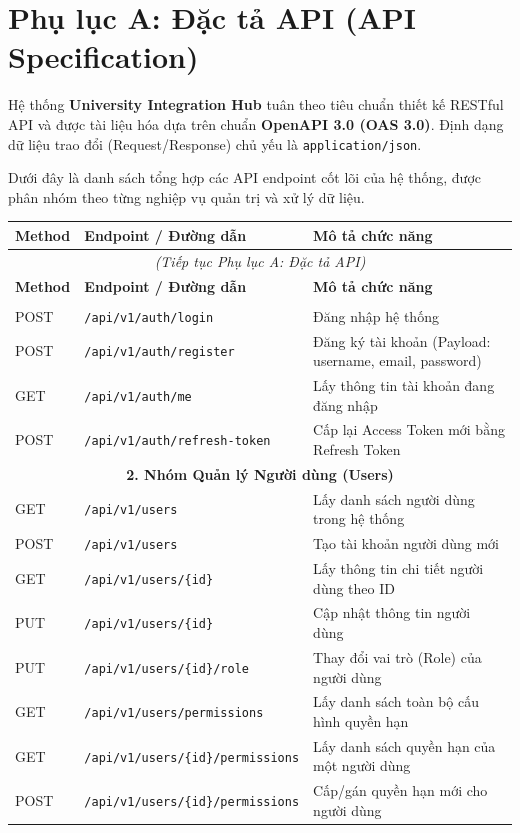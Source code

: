 \section*{Phụ lục A: Đặc tả API (API Specification)}

Hệ thống \textbf{University Integration Hub} tuân theo tiêu chuẩn thiết kế RESTful API và được tài liệu hóa dựa trên chuẩn \textbf{OpenAPI 3.0 (OAS 3.0)}. Định dạng dữ liệu trao đổi (Request/Response) chủ yếu là \texttt{application/json}. 

Dưới đây là danh sách tổng hợp các API endpoint cốt lõi của hệ thống, được phân nhóm theo từng nghiệp vụ quản trị và xử lý dữ liệu.

\begin{longtable}{|p{1.5cm}|p{8cm}|p{5.8cm}|}
\hline
\textbf{Method} & \textbf{Endpoint / Đường dẫn} & \textbf{Mô tả chức năng} \\ \hline
\endfirsthead

\multicolumn{3}{c}{\textit{(Tiếp tục Phụ lục A: Đặc tả API)}} \\
\hline
\textbf{Method} & \textbf{Endpoint / Đường dẫn} & \textbf{Mô tả chức năng} \\ \hline
\endhead

\hline
\endfoot

\hline
\endlastfoot

\multicolumn{3}{|c|}{\textbf{1. Nhóm Xác thực (Auth)}} \\ \hline
POST & \texttt{/api/v1/auth/login} & Đăng nhập hệ thống \\ \hline
POST & \texttt{/api/v1/auth/register} & Đăng ký tài khoản (Payload: username, email, password) \\ \hline
GET & \texttt{/api/v1/auth/me} & Lấy thông tin tài khoản đang đăng nhập \\ \hline
POST & \texttt{/api/v1/auth/refresh-token} & Cấp lại Access Token mới bằng Refresh Token \\ \hline

\multicolumn{3}{|c|}{\textbf{2. Nhóm Quản lý Người dùng (Users)}} \\ \hline
GET & \texttt{/api/v1/users} & Lấy danh sách người dùng trong hệ thống \\ \hline
POST & \texttt{/api/v1/users} & Tạo tài khoản người dùng mới \\ \hline
GET & \texttt{/api/v1/users/\{id\}} & Lấy thông tin chi tiết người dùng theo ID \\ \hline
PUT & \texttt{/api/v1/users/\{id\}} & Cập nhật thông tin người dùng \\ \hline
PUT & \texttt{/api/v1/users/\{id\}/role} & Thay đổi vai trò (Role) của người dùng \\ \hline
GET & \texttt{/api/v1/users/permissions} & Lấy danh sách toàn bộ cấu hình quyền hạn \\ \hline
GET & \texttt{/api/v1/users/\{id\}/permissions} & Lấy danh sách quyền hạn của một người dùng \\ \hline
POST & \texttt{/api/v1/users/\{id\}/permissions} & Cấp/gán quyền hạn mới cho người dùng \\ \hline


\end{longtable}
